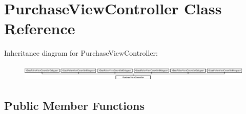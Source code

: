 \hypertarget{interface_purchase_view_controller}{
\section{PurchaseViewController Class Reference}
\label{interface_purchase_view_controller}
}
Inheritance diagram for PurchaseViewController:\begin{figure}[H]
\begin{center}
\leavevmode
\includegraphics[height=0.804598cm]{interface_purchase_view_controller}
\end{center}
\end{figure}
\subsection*{Public Member Functions}
